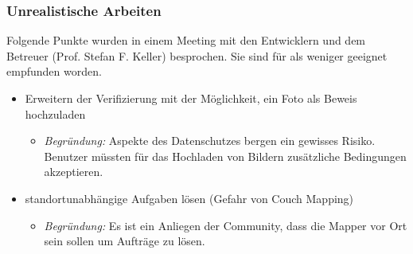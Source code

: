 \subsubsection{Unrealistische Arbeiten}
Folgende Punkte wurden in einem Meeting mit den Entwicklern und dem Betreuer (Prof. Stefan F. Keller) besprochen. 
Sie sind für \kort{} als weniger geeignet empfunden worden.

\begin{itemize}
	\item Erweitern der Verifizierung mit der Möglichkeit, ein Foto als Beweis hochzuladen
	\begin{itemize}
	  \item \emph{Begründung:} Aspekte des Datenschutzes bergen ein gewisses Risiko. Benutzer müssten für das Hochladen von Bildern zusätzliche Bedingungen akzeptieren.
	\end{itemize}
	\item standortunabhängige Aufgaben lösen (Gefahr von Couch Mapping)
	\begin{itemize}
	  \item \emph{Begründung:} Es ist ein Anliegen der  Community, dass die Mapper vor Ort sein sollen um Aufträge zu lösen. 
	\end{itemize}
\end{itemize}

